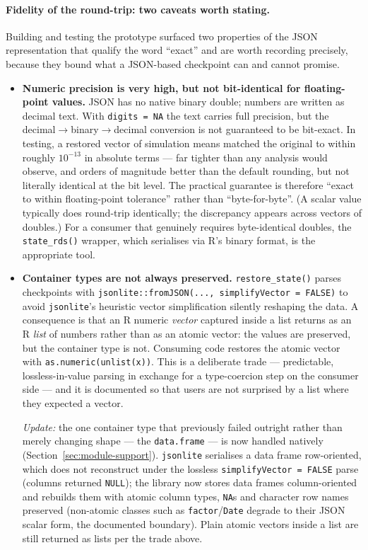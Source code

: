 \documentclass[11pt,a4paper]{article}
\begin{document}
\paragraph{Fidelity of the round-trip: two caveats worth stating.}
Building and testing the prototype surfaced two properties of the JSON
representation that qualify the word ``exact'' and are worth recording precisely,
because they bound what a JSON-based checkpoint can and cannot promise.

\begin{itemize}
  \item \textbf{Numeric precision is very high, but not bit-identical for
    floating-point values.} JSON has no native binary double; numbers are written
    as decimal text. With \texttt{digits = NA} the text carries full precision,
    but the decimal$\rightarrow$binary$\rightarrow$decimal conversion is not
    guaranteed to be bit-exact. In testing, a restored vector of simulation means
    matched the original to within roughly $10^{-13}$ in absolute terms --- far
    tighter than any analysis would observe, and orders of magnitude better than
    the default rounding, but not literally identical at the bit level. The
    practical guarantee is therefore ``exact to within floating-point tolerance''
    rather than ``byte-for-byte''. (A scalar value typically does round-trip
    identically; the discrepancy appears across vectors of doubles.) For a
    consumer that genuinely requires byte-identical doubles, the
    \texttt{state\_rds()} wrapper, which serialises via R's binary format, is the
    appropriate tool.
  \item \textbf{Container types are not always preserved.} \texttt{restore\_state()}
    parses checkpoints with \texttt{jsonlite::fromJSON(..., simplifyVector =
    FALSE)} to avoid \texttt{jsonlite}'s heuristic vector simplification silently
    reshaping the data. A consequence is that an R numeric \emph{vector} captured
    inside a list returns as an R \emph{list} of numbers rather than as an atomic
    vector: the values are preserved, but the container type is not. Consuming
    code restores the atomic vector with \texttt{as.numeric(unlist(x))}. This is a
    deliberate trade --- predictable, lossless-in-value parsing in exchange for a
    type-coercion step on the consumer side --- and it is documented so that users
    are not surprised by a list where they expected a vector.

    \emph{Update:} the one container type that previously failed outright rather
    than merely changing shape --- the \texttt{data.frame} --- is now handled
    natively (Section~\ref{sec:module-support}). \texttt{jsonlite} serialises a
    data frame row-oriented, which does not reconstruct under the lossless
    \texttt{simplifyVector = FALSE} parse (columns returned \texttt{NULL}); the
    library now stores data frames column-oriented and rebuilds them with
    atomic column types, \texttt{NA}s and character row names preserved
    (non-atomic classes such as \texttt{factor}/\texttt{Date} degrade to their
    JSON scalar form, the documented boundary). Plain atomic
    vectors inside a list are still returned as lists per the trade above.
\end{itemize}
\end{document}
